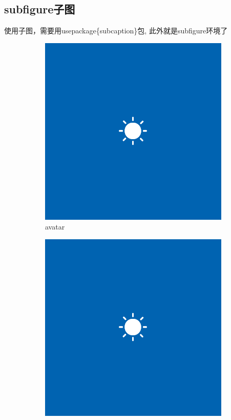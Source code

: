 \subsection{subfigure子图}
使用子图，需要用usepackage\{subcaption\}包, 此外就是subfigure环境了
\begin{figure}[h!]
	\centering
	\begin{subfigure}{0.4\linewidth}
		\includegraphics[width=\linewidth]{avatar.png}
		\caption{avatar}
	\end{subfigure}
	\begin{subfigure}{0.4\linewidth}
		\includegraphics[width=\linewidth]{avatar.png}

\end{subfigure}
\end{figure}
